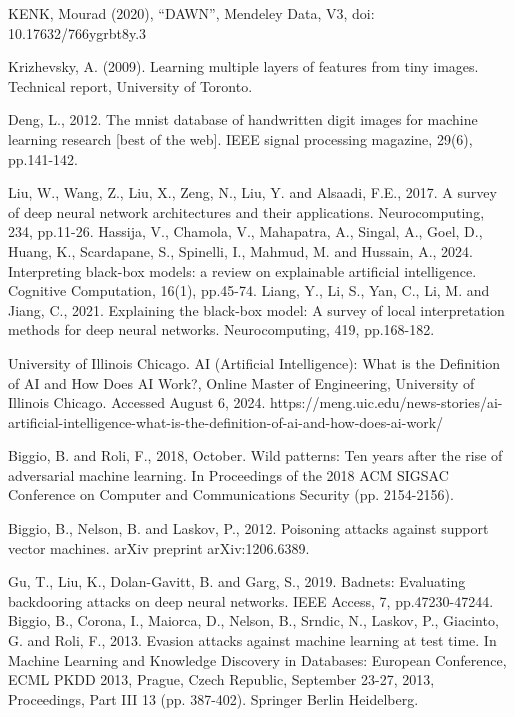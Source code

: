\begin{singlespace}
\begin{thebibliography}{}
KENK, Mourad (2020), “DAWN”, Mendeley Data, V3, doi: 10.17632/766ygrbt8y.3

Krizhevsky, A. (2009). Learning multiple layers of features from tiny images. Technical report, University of Toronto.


Deng, L., 2012. The mnist database of handwritten digit images for machine learning research [best of the web]. IEEE signal processing magazine, 29(6), pp.141-142.



 Liu, W., Wang, Z., Liu, X., Zeng, N., Liu, Y. and Alsaadi, F.E., 2017. A survey of deep neural network architectures and their applications. Neurocomputing, 234, pp.11-26.    Hassija, V., Chamola, V., Mahapatra, A., Singal, A., Goel, D., Huang, K., Scardapane, S., Spinelli, I., Mahmud, M. and Hussain, A., 2024. Interpreting black-box models: a review on explainable artificial intelligence. Cognitive Computation, 16(1), pp.45-74.
 Liang, Y., Li, S., Yan, C., Li, M. and Jiang, C., 2021. Explaining the black-box model: A survey of local interpretation methods for deep neural networks. Neurocomputing, 419, pp.168-182.

 University of Illinois Chicago. AI (Artificial Intelligence): What is the Definition of AI and How Does AI Work?, Online Master of Engineering, University of Illinois Chicago. Accessed August 6, 2024. https://meng.uic.edu/news-stories/ai-artificial-intelligence-what-is-the-definition-of-ai-and-how-does-ai-work/

 
 
 
  Biggio, B. and Roli, F., 2018, October. Wild patterns: Ten years after the rise of adversarial machine learning. In Proceedings of the 2018 ACM SIGSAC Conference on Computer and Communications Security (pp. 2154-2156).

 Biggio, B., Nelson, B. and Laskov, P., 2012. Poisoning attacks against support vector machines. arXiv preprint arXiv:1206.6389.


 Gu, T., Liu, K., Dolan-Gavitt, B. and Garg, S., 2019. Badnets: Evaluating backdooring attacks on deep neural networks. IEEE Access, 7, pp.47230-47244.
 Biggio, B., Corona, I., Maiorca, D., Nelson, B., Srndic, N., Laskov, P., Giacinto, G. and Roli, F., 2013. Evasion attacks against machine learning at test time. In Machine Learning and Knowledge Discovery in Databases: European Conference, ECML PKDD 2013, Prague, Czech Republic, September 23-27, 2013, Proceedings, Part III 13 (pp. 387-402). Springer Berlin Heidelberg.


\end{thebibliography}
\end{singlespace}
